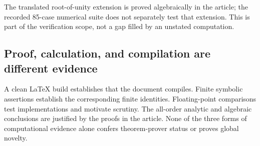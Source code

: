 \documentclass[11pt,letterpaper]{article}
\numberwithin{equation}{section}
\theoremstyle{definition}\newtheorem{definition}[theorem]{Definition}
\theoremstyle{remark}\newtheorem{remark}[theorem]{Remark}
\begin{document}
The translated root-of-unity extension is proved algebraically in the
article; the recorded 85-case numerical suite does not separately test
that extension. This is part of the verification scope, not a gap
filled by an unstated computation.

\subsection{Proof, calculation, and compilation are different evidence}
A clean LaTeX build establishes that the document compiles. Finite
symbolic assertions establish the corresponding finite identities.
Floating-point comparisons test implementations and motivate scrutiny.
The all-order analytic and algebraic conclusions are justified by the
proofs in the article. None of the three forms of computational evidence
alone confers theorem-prover status or proves global novelty.

\end{document}
